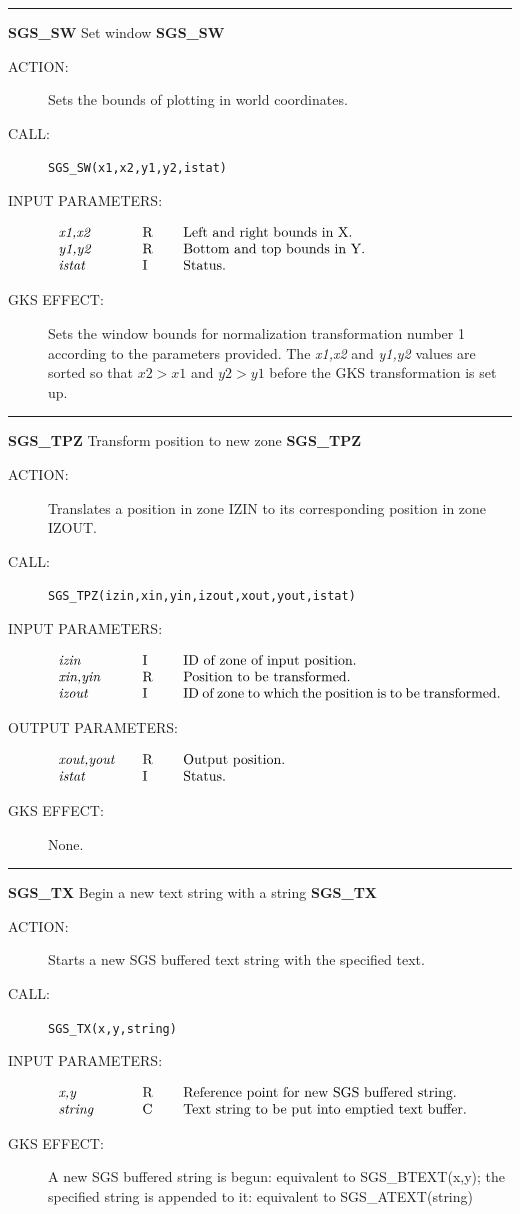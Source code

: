 \documentclass[11pt]{article}
\newcommand{\htmlref}[2]{#1}
\newcommand{\xlabel}[1]{}
\newcommand{\rthead}[2]{\rule{\textwidth}{0.3mm}
{\Large {\bf #1} \hfill #2 \hfill {\bf #1}}}
\newenvironment{params}%
{\[\begin{tabular}{p{0.14\textwidth}p{0.05\textwidth}p{0.66\textwidth}}}%
{\end{tabular}\]}
\newcommand{\rparams}[3]{{\em #1} &#2 &#3\\}
\newcommand{\rthead}[2]{\subsection{\label{#1}\xlabel{#1}#1 - #2}}
\newenvironment{params}{\begin{description}}{\end{description}}
\newcommand{\rparams}[3]{\item{{\em #1}} (#2) #3}
\begin{document}
\rthead{SGS\_SW}{Set window}
\begin{description}
\item [ACTION:]
Sets the bounds of plotting in world coordinates.
\item [CALL:]
{\tt SGS\_SW(x1,x2,y1,y2,istat)}
\item [INPUT PARAMETERS:]
\begin{params}
\rparams{x1,x2}{R}{Left and right bounds in X.}
\rparams{y1,y2}{R}{Bottom and top bounds in Y.}
\rparams{istat}{I}{Status.}
\end{params}
\item [GKS EFFECT:]
Sets the window bounds for normalization transformation number 1 according to
the parameters provided.
The {\it x1,x2} and {\it y1,y2} values are sorted so that $\mathit{x2}>
\mathit{x1}$ and $\mathit{y2}>\mathit{y1}$ before the GKS transformation is set up.
\end{description}
\goodbreak

\rthead{SGS\_TPZ}{Transform position to new zone}
\begin{description}
\item [ACTION:]
Translates a position in zone IZIN to its corresponding position in zone IZOUT.
\item [CALL:]
{\tt SGS\_TPZ(izin,xin,yin,izout,xout,yout,istat)}
\item [INPUT PARAMETERS:]
\begin{params}
\rparams{izin}{I}{ID of zone of input position.}
\rparams{xin,yin}{R}{Position to be transformed.}
\rparams{izout}{I}{ID of zone to which the position is to be transformed.}
\end{params}
\item [OUTPUT PARAMETERS:]
\begin{params}
\rparams{xout,yout}{R}{Output position.}
\rparams{istat}{I}{Status.}
\end{params}
\item [GKS EFFECT:]
None.
\end{description}
\goodbreak

\rthead{SGS\_TX}{Begin a new text string with a string}
\begin{description}
\item [ACTION:]
Starts a new SGS buffered text string with the specified text.
\item [CALL:]
{\tt SGS\_TX(x,y,string)}
\item [INPUT PARAMETERS:]
\begin{params}
\rparams{x,y}{R}{Reference point for new SGS buffered string.}
\rparams{string}{C}{Text string to be put into emptied text buffer.}
\end{params}
\item [GKS EFFECT:]
A new SGS buffered string is begun: equivalent to 
\htmlref{SGS\_BTEXT}{SGS_BTEXT}(x,y); the
specified string is appended to it: equivalent to 
\htmlref{SGS\_ATEXT}{SGS_ATEXT}(string)
\end{description}
\goodbreak
\end{document}
